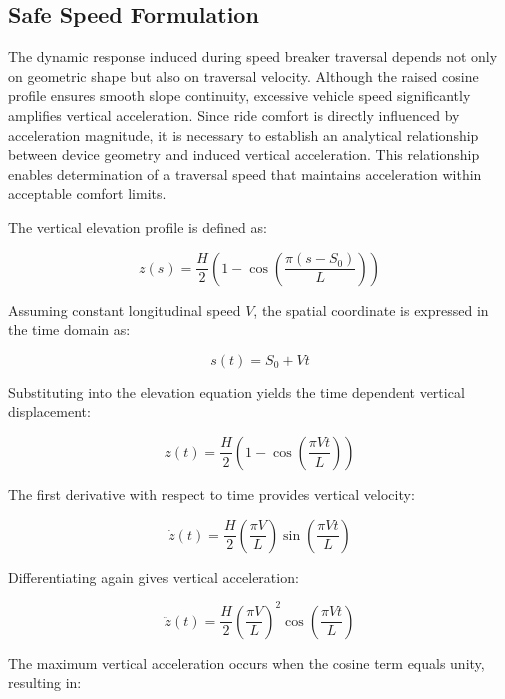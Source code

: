 \documentclass[a4paper,12pt,one side]{report}
\theoremstyle{definition}
\begin{document}
\begin{itemize}
\subsection{Safe Speed Formulation}

The dynamic response induced during speed breaker traversal depends not only on geometric shape but also on traversal velocity. Although the raised cosine profile ensures smooth slope continuity, excessive vehicle speed significantly amplifies vertical acceleration. Since ride comfort is directly influenced by acceleration magnitude, it is necessary to establish an analytical relationship between device geometry and induced vertical acceleration. This relationship enables determination of a traversal speed that maintains acceleration within acceptable comfort limits.

The vertical elevation profile is defined as:

\begin{equation}
z(s) = \frac{H}{2}\left( 1 - \cos\left( \frac{\pi(s - S_{0})}{L} \right) \right) \tag{6.6}
\end{equation}

Assuming constant longitudinal speed $V$, the spatial coordinate is expressed in the time domain as:

\begin{equation}
s(t) = S_{0} + Vt \tag{6.7}
\end{equation}

Substituting into the elevation equation yields the time dependent vertical displacement:

\begin{equation}
z(t) = \frac{H}{2}\left( 1 - \cos\left( \frac{\pi Vt}{L} \right) \right) \tag{6.8}
\end{equation}

The first derivative with respect to time provides vertical velocity:

\begin{equation}
\dot{z}(t) = \frac{H}{2}\left( \frac{\pi V}{L} \right)\sin\left( \frac{\pi Vt}{L} \right) \tag{6.9}
\end{equation}

Differentiating again gives vertical acceleration:

\begin{equation}
\ddot{z}(t) = \frac{H}{2}\left( \frac{\pi V}{L} \right)^{2}\cos\left( \frac{\pi Vt}{L} \right) \tag{6.10}
\end{equation}

The maximum vertical acceleration occurs when the cosine term equals unity, resulting in:


\end{itemize}
\end{document}
